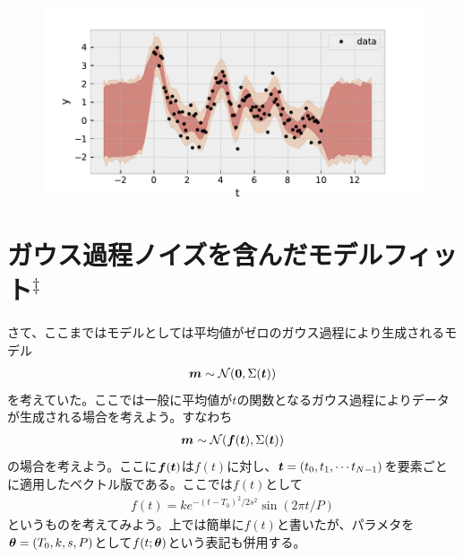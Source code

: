 \begin{figure}[htb]
\begin{center}
\includegraphics[width=\linewidth]{fig/gp/gp6.pdf}
\caption{\label{fig:gp6}}
\end{center}
\end{figure}

\section{ガウス過程ノイズを含んだモデルフィット$^\ddagger$}

さて、ここまではモデルとしては平均値がゼロのガウス過程により生成されるモデル
\begin{align}
\boldsymbol{m} \sim \mathcal{N} ({\bf 0},\Sigma(\boldsymbol{t})) 
\end{align}
を考えていた。ここでは一般に平均値が$t$の関数となるガウス過程によりデータが生成される場合を考えよう。すなわち
\begin{align}
\label{eq:modelgp}
\boldsymbol{m} \sim \mathcal{N} (\boldsymbol{f}(\boldsymbol{t}),\Sigma(\boldsymbol{t})) 
\end{align}
の場合を考えよう。ここに$\boldsymbol{f}(\boldsymbol{t})$は$f(t)$に対し、$\boldsymbol{t}=(t_0,t_1,\cdots t_{N-1})$を要素ごとに適用したベクトル版である。ここでは$f(t)$として
\begin{align}
f(t) = k e^{-(t-T_0)^2/2 s^2} \sin{(2 \pi t/P)}
\end{align}
というものを考えてみよう。上では簡単に$f(t)$と書いたが、パラメタを$\boldsymbol{\theta}=(T_0,k,s,P)$として$f(t;\boldsymbol{\theta})$という表記も併用する。

